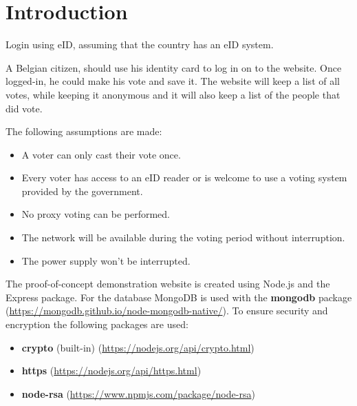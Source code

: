 \section{Introduction}
\label{sec:introduction}
% 
Login using eID, assuming that the country has an eID system.

A Belgian citizen, should use his identity card to log in on to the website.
Once logged-in, he could make his vote and save it.
The website will keep a list of all votes, while keeping it anonymous and it will also keep a list of the people that did vote.

The following assumptions are made:
\begin{itemize}
    \item A voter can only cast their vote once.
    \item Every voter has access to an eID reader or is welcome to use a voting system provided by the government.
    \item No proxy voting can be performed.
    \item The network will be available during the voting period without interruption.
    \item The power supply won't be interrupted.
\end{itemize}

The proof-of-concept demonstration website is created using Node.js and the Express package.
For the database MongoDB is used with the \textbf{mongodb} package (\url{https://mongodb.github.io/node-mongodb-native/}).
To ensure security and encryption the following packages are used:
\begin{itemize}
    \item \textbf{crypto} (built-in) (\url{https://nodejs.org/api/crypto.html})
    \item \textbf{https} (\url{https://nodejs.org/api/https.html})
    \item \textbf{node-rsa} (\url{https://www.npmjs.com/package/node-rsa})
\end{itemize}